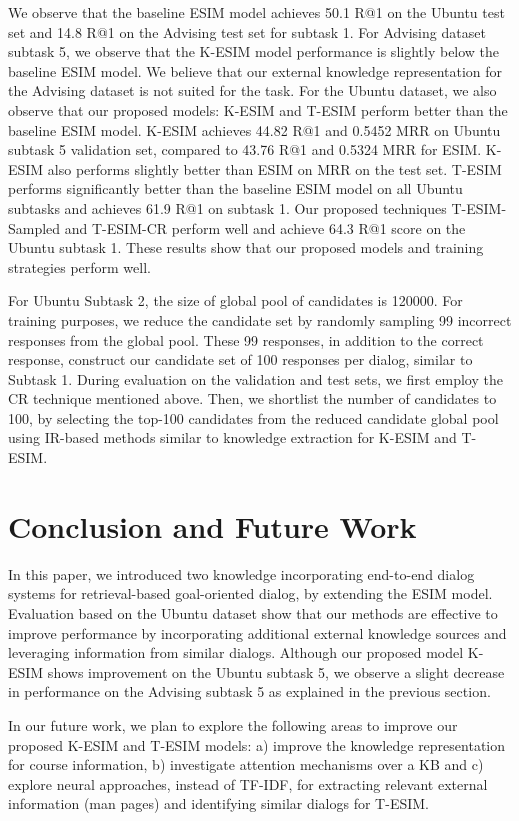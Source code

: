 \documentclass[letterpaper]{article} %
\begin{document}
We observe that the baseline ESIM model achieves 50.1 R@1 on the Ubuntu test set and 14.8 R@1 on the Advising test set for subtask 1. For Advising dataset subtask 5, we observe that the K-ESIM model performance is slightly below the baseline ESIM model. We believe that our external knowledge representation for the Advising dataset is not suited for the task. For the Ubuntu dataset, we also observe that our proposed models: K-ESIM and T-ESIM perform better than the baseline ESIM model. K-ESIM achieves 44.82 R@1 and 0.5452 MRR on Ubuntu subtask 5 validation set, compared to 43.76 R@1 and 0.5324 MRR for ESIM. K-ESIM also performs slightly better than ESIM on MRR on the test set. T-ESIM performs significantly better than the baseline ESIM model on all Ubuntu subtasks and achieves 61.9 R@1 on subtask 1. Our proposed techniques T-ESIM-Sampled and T-ESIM-CR perform well and achieve 64.3 R@1 score on the Ubuntu subtask 1. These results show that our proposed models and training strategies perform well.

For Ubuntu Subtask 2, the size of global pool of candidates is 120000. For training purposes, we reduce the candidate set by randomly sampling 99 incorrect responses from the global pool. These 99 responses, in addition to the correct response, construct our candidate set of 100 responses per dialog, similar to Subtask 1. During evaluation on the validation and test sets, we first employ the CR technique mentioned above. Then, we shortlist the number of candidates to 100, by selecting the top-100 candidates from the reduced candidate global pool using IR-based methods similar to knowledge extraction for K-ESIM and T-ESIM.

\section{Conclusion and Future Work}
In this paper, we introduced two knowledge incorporating end-to-end dialog systems for retrieval-based goal-oriented dialog, by extending the ESIM model. Evaluation based on the Ubuntu dataset show that our methods are effective to improve performance by incorporating additional external knowledge sources and leveraging information from similar dialogs. Although our proposed model K-ESIM shows improvement on the Ubuntu subtask 5, we observe a slight decrease in performance on the Advising subtask 5 as explained in the previous section.

In our future work, we plan to explore the following areas to improve our proposed K-ESIM and T-ESIM models: a) improve the knowledge representation for course information, b) investigate attention mechanisms over a KB \cite{eric2017key} and c) explore neural approaches, instead of TF-IDF, for extracting relevant external information (man pages) and identifying similar dialogs for T-ESIM.
\end{document}
